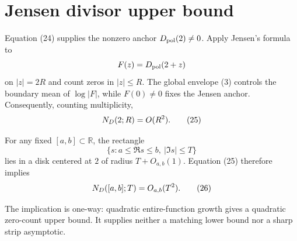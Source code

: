 \section{Jensen divisor upper bound}
Equation (24) supplies the nonzero anchor \(D_{\mathrm{pol}}(2)\ne0\). Apply Jensen's
formula to
\[
 F(z)=D_{\mathrm{pol}}(2+z)
\]
on \(|z|=2R\) and count zeros in \(|z|\le R\). The global envelope (3)
controls the boundary mean of \(\log|F|\), while \(F(0)\ne0\) fixes the
Jensen anchor. Consequently, counting multiplicity,
\[
 N_D(2;R)=O(R^2).
 \tag{25}
\]

For any fixed \([a,b]\subset\mathbb R\), the rectangle
\[
 \{s:a\le\Re s\le b,\ |\Im s|\le T\}
\]
lies in a disk centered at \(2\) of radius
\(T+O_{a,b}(1)\). Equation (25) therefore implies
\[
 N_D([a,b];T)=O_{a,b}(T^2).
 \tag{26}
\]

The implication is one-way: quadratic entire-function growth gives a
quadratic zero-count upper bound. It supplies neither a matching lower bound
nor a sharp strip asymptotic.
